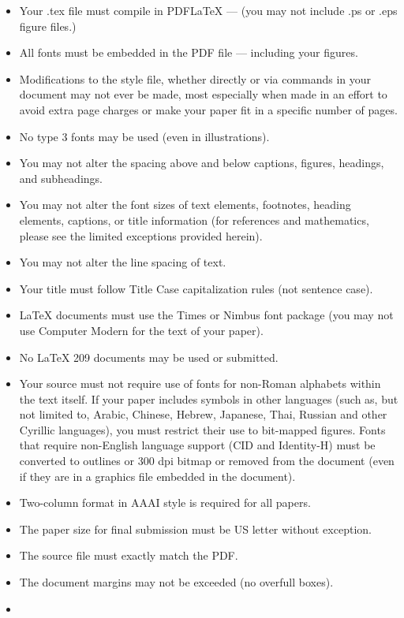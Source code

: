 \documentclass[letterpaper]{article} %
\begin{document}
\begin{itemize}
\tightlist
\item
  Your .tex file must compile in PDF{\LaTeX} --- (you may not include
  .ps or .eps figure files.)
\item
  All fonts must be embedded in the PDF file --- including your figures.
\item
  Modifications to the style file, whether directly or via commands in
  your document may not ever be made, most especially when made in an
  effort to avoid extra page charges or make your paper fit in a
  specific number of pages.
\item
  No type 3 fonts may be used (even in illustrations).
\item
  You may not alter the spacing above and below captions, figures,
  headings, and subheadings.
\item
  You may not alter the font sizes of text elements, footnotes, heading
  elements, captions, or title information (for references and
  mathematics, please see the limited exceptions provided herein).
\item
  You may not alter the line spacing of text.
\item
  Your title must follow Title Case capitalization rules (not sentence
  case).
\item
  {\LaTeX} documents must use the Times or Nimbus font package (you may
  not use Computer Modern for the text of your paper).
\item
  No {\LaTeX} 209 documents may be used or submitted.
\item
  Your source must not require use of fonts for non-Roman alphabets
  within the text itself. If your paper includes symbols in other
  languages (such as, but not limited to, Arabic, Chinese, Hebrew,
  Japanese, Thai, Russian and other Cyrillic languages), you must
  restrict their use to bit-mapped figures. Fonts that require
  non-English language support (CID and Identity-H) must be converted to
  outlines or 300 dpi bitmap or removed from the document (even if they
  are in a graphics file embedded in the document).
\item
  Two-column format in AAAI style is required for all papers.
\item
  The paper size for final submission must be US letter without
  exception.
\item
  The source file must exactly match the PDF.
\item
  The document margins may not be exceeded (no overfull boxes).
\item

\end{itemize}
\end{document}
